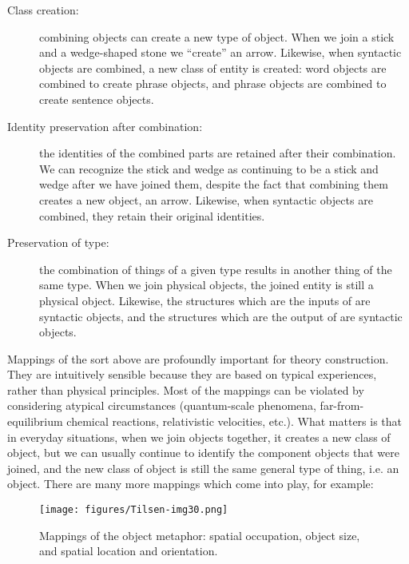 \begin{description}
\item[Class creation:] combining objects can create a new type of object. When we join a stick and a wedge-shaped stone we “create” an arrow. Likewise, when syntactic objects are combined, a new class of entity is created: word objects are combined to create phrase objects, and phrase objects are combined to create sentence objects. 

\item[Identity preservation after combination:] the identities of the combined parts are retained after their combination. We can recognize the stick and wedge as continuing to be a stick and wedge after we have joined them, despite the fact that combining them creates a new object, an arrow. Likewise, when syntactic objects are combined, they retain their original identities.

\item[Preservation of type:] the combination of things of a given type results in another thing of the same type. When we join physical objects, the joined entity is still a physical object. Likewise, the structures which are the inputs of {} are syntactic objects, and the structures which are the output of {} are syntactic objects.
\end{description}

Mappings of the sort above are profoundly important for theory construction. They are intuitively sensible because they are based on typical experiences, rather than physical principles. Most of the mappings can be violated by considering atypical circumstances (quantum-scale phenomena, far-from-equilibrium chemical reactions, relativistic velocities, etc.). What matters is that in everyday situations, when we join objects together, it creates a new class of object, but we can usually continue to identify the component objects that were joined, and the new class of object is still the same general type of thing, i.e. an object. There are many more mappings which come into play, for example:
  
\begin{figure}[H]
\texttt{[image: figures/Tilsen-img30.png]}
\caption{Mappings of the object metaphor: spatial occupation, object size, and spatial location and orientation.}
\label{fig:3:2}
\end{figure}
 
